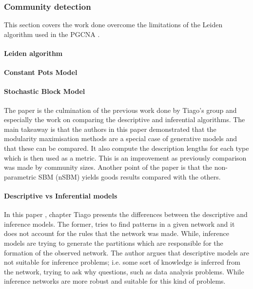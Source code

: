 \subsubsection{Community detection}

This section covers the work done overcome the limitations of the Leiden algorithm used in the PGCNA \cite{Care2019-ij}.

\paragraph{Leiden algorithm}

\paragraph{Constant Pots Model}

\paragraph{Stochastic Block Model}


The paper \cite{Peixoto2023-rt} is the culmination of the previous work done by Tiago's group and especially the work on comparing the descriptive and inferential algorithms. The main takeaway is that the authors in this paper demonstrated that the modularity maximisation methods are a special case of generative models and that these can be compared. It also compute the description lengths for each type which is then used as a metric. This is an improvement as previously \citet{Peixoto2021-jx} comparison was made by community sizes. Another point of the paper is that the non-parametric SBM (nSBM) \cite{Peixoto2014-yb} yields goods results compared with the others.

\paragraph{Descriptive vs Inferential models}

In this paper \citet{Peixoto2021-jx}, chapter Tiago presents the differences between the descriptive and inference models. The former, tries to find patterns in a given network and it does not account for the rules that the network was made. While,  inference models are trying to generate the partitions which are responsible for the formation of the observed network. The author argues that descriptive models are not suitable for inference problems; i.e. some sort of knowledge is inferred from the network, trying to ask why questions, such as data analysis problems. While inference networks are more robust and suitable for this kind of problems.

